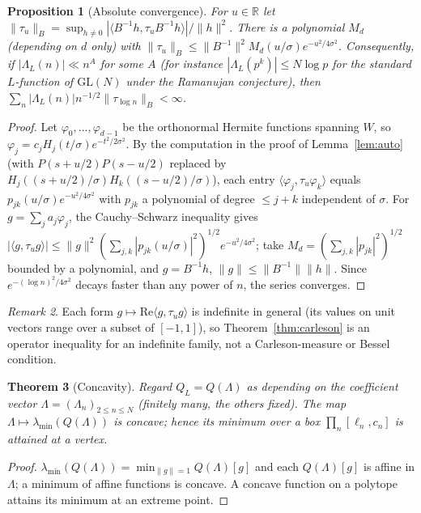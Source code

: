 \documentclass[11pt]{amsart}
\newtheorem{theorem}{Theorem}[section]
\newtheorem{proposition}[theorem]{Proposition}
\theoremstyle{definition}
\theoremstyle{remark}
\newtheorem{remark}[theorem]{Remark}
\newcommand{\GL}{\mathrm{GL}}
\begin{document}
\begin{proposition}[Absolute convergence]\label{prop:finite}
For $u\in\mathbb R$ let $\|\tau_u\|_B=\sup_{h\ne0}|\langle B^{-1}h,\tau_uB^{-1}h
\rangle|/\|h\|^2$. There is a polynomial $M_d$ (depending on $d$ only) with
$\|\tau_u\|_B\le\|B^{-1}\|^2M_d(u/\sigma)e^{-u^2/4\sigma^2}$. Consequently, if
$|\Lambda_L(n)|\ll n^{A}$ for some $A$ (for instance
$|\Lambda_L(p^k)|\le N\log p$ for the standard $L$-function of $\GL(N)$ under the
Ramanujan conjecture), then $\sum_n|\Lambda_L(n)|n^{-1/2}\|\tau_{\log n}\|_B<\infty$.
\end{proposition}
\begin{proof}
Let $\varphi_0,\dots,\varphi_{d-1}$ be the orthonormal Hermite functions spanning
$W$, so $\varphi_j=c_jH_j(t/\sigma)e^{-t^2/2\sigma^2}$. By the computation in the
proof of Lemma~\ref{lem:auto} (with $P(s+u/2)P(s-u/2)$ replaced by
$H_j((s+u/2)/\sigma)H_k((s-u/2)/\sigma)$), each entry
$\langle\varphi_j,\tau_u\varphi_k\rangle$ equals $p_{jk}(u/\sigma)e^{-u^2/4\sigma^2}$
with $p_{jk}$ a polynomial of degree $\le j+k$ independent of $\sigma$. For
$g=\sum_ja_j\varphi_j$, the Cauchy--Schwarz inequality gives
$|\langle g,\tau_ug\rangle|\le\|g\|^2(\sum_{j,k}|p_{jk}(u/\sigma)|^2)^{1/2}
e^{-u^2/4\sigma^2}$; take $M_d=(\sum_{j,k}|p_{jk}|^2)^{1/2}$ bounded by a polynomial,
and $g=B^{-1}h$, $\|g\|\le\|B^{-1}\|\|h\|$. Since
$e^{-(\log n)^2/4\sigma^2}$ decays faster than any power of $n$, the series
converges.
\end{proof}

\begin{remark}
Each form $g\mapsto\mathrm{Re}\langle g,\tau_ug\rangle$ is indefinite in general
(its values on unit vectors range over a subset of $[-1,1]$), so
Theorem~\ref{thm:carleson} is an operator inequality for an indefinite family,
not a Carleson-measure or Bessel condition.
\end{remark}

\begin{theorem}[Concavity]\label{thm:concave}
Regard $Q_L=Q(\Lambda)$ as depending on the coefficient vector
$\Lambda=(\Lambda_n)_{2\le n\le N}$ (finitely many, the others fixed). The map
$\Lambda\mapsto\lambda_{\min}(Q(\Lambda))$ is concave; hence its minimum over a
box $\prod_n[\ell_n,c_n]$ is attained at a vertex.
\end{theorem}
\begin{proof}
$\lambda_{\min}(Q(\Lambda))=\min_{\|g\|=1}Q(\Lambda)[g]$ and each
$Q(\Lambda)[g]$ is affine in $\Lambda$; a minimum of affine functions is concave.
A concave function on a polytope attains its minimum at an extreme point.
\end{proof}
\end{document}
